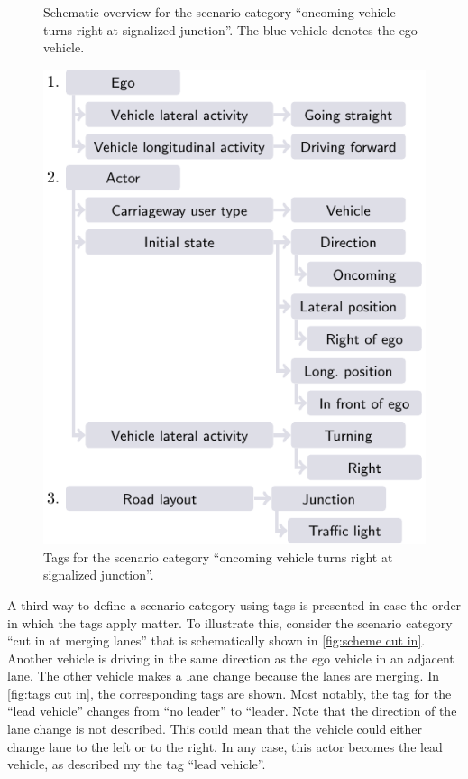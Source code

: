 \setlength{\figurewidth}{15.0em}
\begin{figure}[t]
	\centering
	
	\caption{Schematic overview for the scenario category ``oncoming vehicle turns right at signalized junction''. The blue vehicle denotes the ego vehicle.}
	\label{fig:scheme oncoming turning}
\end{figure}
\begin{figure}[t]
	\centering
	\includegraphics{figures/oncoming_turning}
	\caption{Tags for the scenario category ``oncoming vehicle turns right at signalized junction''.}
	\label{fig:tags oncoming turning}
\end{figure}

A third way to define a scenario category using tags is presented in case the order in which the tags apply matter. To illustrate this, consider the scenario category ``cut in at merging lanes'' that is schematically shown in \cref{fig:scheme cut in}. 
Another vehicle is driving in the same direction as the ego vehicle in an adjacent lane. The other vehicle makes a lane change because the lanes are merging. In \cref{fig:tags cut in}, the corresponding tags are shown. Most notably, the tag for the ``lead vehicle'' changes from ``no leader'' to ``leader. Note that the direction of the lane change is not described. This could mean that the vehicle could either change lane to the left or to the right. In any case, this actor becomes the lead vehicle, as described my the tag ``lead vehicle''. 

